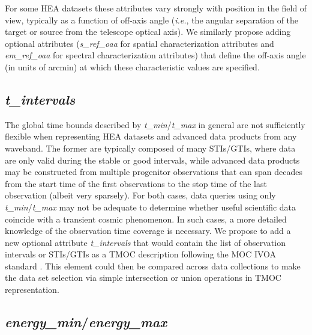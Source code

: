 \documentclass[11pt,a4paper]{ivoa}
\begin{document}
For some HEA datasets these attributes vary strongly with position in the field of view, typically as a function of off-axis angle ({\em i.e.\/}, the angular separation of the target or source from the telescope optical axis). We similarly propose adding optional attributes ({\em s\_ref\_oaa\/} for spatial characterization attributes and {\em em\_ref\_oaa\/} for spectral characterization attributes) that define the off-axis angle (in units of arcmin) at which these characteristic values are specified.

\subsection{{\em t\_intervals}}

The global time bounds described by {\em t\_min\/}/{\em t\_max} in general are not sufficiently flexible when representing HEA datasets and advanced data products from any waveband.  The former are typically composed of many \glspl{STI}/\glspl{GTI}, where data are only valid during the stable or good intervals, while advanced data products may be constructed from multiple progenitor observations that can span decades from the start time of the first observations to the stop time of the last observation (albeit very sparsely).  For both cases, data queries using only {\em t\_min\/}/{\em t\_max} may not be adequate to determine whether useful scientific data coincide with a transient cosmic phenomenon.  In such cases, a more detailed knowledge of the observation time coverage is necessary.  We propose to add a new optional attribute {\em t\_intervals} that would contain the list of observation intervals or STIs/GTIs as a TMOC description following the \gls{MOC} \gls{IVOA} standard  \citep{2022ivoa.spec.0727F}. This element could then be compared across data collections to make the data set selection via simple intersection or union operations in TMOC representation.

\subsection{{\em energy\_min\/}/{\em energy\_max\/}}
\end{document}
